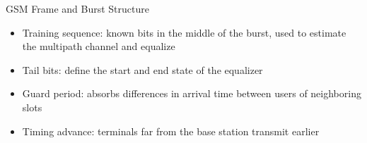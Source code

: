 \begin{frame}{GSM Frame and Burst Structure}
  \centering
  

  \vspace{0.5em}
  \raggedright
  \begin{itemize}
    \item Training sequence: known bits in the middle of the burst, used to estimate the multipath channel and equalize
    \item Tail bits: define the start and end state of the equalizer
    \item Guard period: absorbs differences in arrival time between users of neighboring slots
    \item Timing advance: terminals far from the base station transmit earlier
  \end{itemize}
\end{frame}

